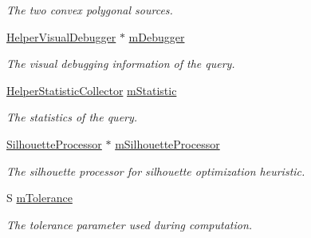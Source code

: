 \begin{DoxyCompactItemize}
\begin{DoxyCompactList}\small\item\em The two convex polygonal sources. \end{DoxyCompactList}\item 
\mbox{\label{classvisilib_1_1_visibility_exact_query___a49f12637fa2d9372e87066476cbea3b1}} 
\mbox{\hyperlink{classvisilib_1_1_helper_visual_debugger}{Helper\+Visual\+Debugger}} $\ast$ \mbox{\hyperlink{classvisilib_1_1_visibility_exact_query___a49f12637fa2d9372e87066476cbea3b1}{m\+Debugger}}
\begin{DoxyCompactList}\small\item\em The visual debugging information of the query. \end{DoxyCompactList}\item 
\mbox{\label{classvisilib_1_1_visibility_exact_query___aff46f0c6ba47127e6cdac7f134a237cf}} 
\mbox{\hyperlink{classvisilib_1_1_helper_statistic_collector}{Helper\+Statistic\+Collector}} \mbox{\hyperlink{classvisilib_1_1_visibility_exact_query___aff46f0c6ba47127e6cdac7f134a237cf}{m\+Statistic}}
\begin{DoxyCompactList}\small\item\em The statistics of the query. \end{DoxyCompactList}\item 
\mbox{\label{classvisilib_1_1_visibility_exact_query___a60724cc0a8bda41cbcf21fa044c76f42}} 
\mbox{\hyperlink{classvisilib_1_1_silhouette_processor}{Silhouette\+Processor}} $\ast$ \mbox{\hyperlink{classvisilib_1_1_visibility_exact_query___a60724cc0a8bda41cbcf21fa044c76f42}{m\+Silhouette\+Processor}}
\begin{DoxyCompactList}\small\item\em The silhouette processor for silhouette optimization heuristic. \end{DoxyCompactList}\item 
\mbox{\label{classvisilib_1_1_visibility_exact_query___afdcd18d5e821195c31a7af89a7101b47}} 
S \mbox{\hyperlink{classvisilib_1_1_visibility_exact_query___afdcd18d5e821195c31a7af89a7101b47}{m\+Tolerance}}
\begin{DoxyCompactList}\small\item\em The tolerance parameter used during computation. \end{DoxyCompactList}\item 

\end{DoxyCompactItemize}
